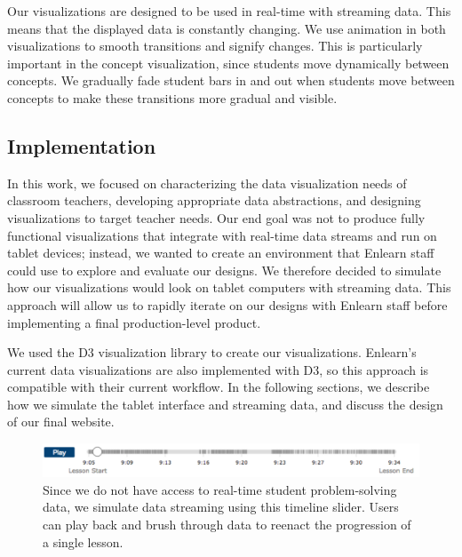 \documentclass{sigchi}
\begin{document}
Our visualizations are designed to be used in real-time with streaming data. This means that the displayed data is constantly changing. We use animation in both visualizations to smooth transitions and signify changes. This is particularly important in the concept visualization, since students move dynamically between concepts. We gradually fade student bars in and out when students move between concepts to make these transitions more gradual and visible. %



\subsection{Implementation}
In this work, we focused on characterizing the data visualization needs of classroom teachers, developing appropriate data abstractions, and designing visualizations to target teacher needs. Our end goal was not to produce fully functional visualizations that integrate with real-time data streams and run on tablet devices; instead, we wanted to create an environment that Enlearn staff could use to explore and evaluate our designs. We therefore decided to simulate how our visualizations would look on tablet computers with streaming data. This approach will allow us to rapidly iterate on our designs with Enlearn staff before implementing a final production-level product.

We used the D3 visualization library to create our visualizations. Enlearn's current data visualizations are also implemented with D3, so this approach is compatible with their current workflow. In the following sections, we describe how we simulate the tablet interface and streaming data, and discuss the design of our final website.

\begin{figure}[t]
\centering
\includegraphics[width=180mm]{images/Timeline.pdf}
\caption{Since we do not have access to real-time student problem-solving data, we simulate data streaming using this timeline slider. Users can play back and brush through data to reenact the progression of a single lesson.}
\label{fig:Timeline}
\end{figure}
\end{document}
